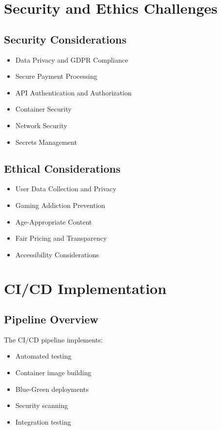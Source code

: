 \documentclass[12pt]{report}
\begin{document}
\chapter{Security and Ethics Challenges}
\section{Security Considerations}
\begin{itemize}
    \item Data Privacy and GDPR Compliance
    \item Secure Payment Processing
    \item API Authentication and Authorization
    \item Container Security
    \item Network Security
    \item Secrets Management
\end{itemize}

\section{Ethical Considerations}
\begin{itemize}
    \item User Data Collection and Privacy
    \item Gaming Addiction Prevention
    \item Age-Appropriate Content
    \item Fair Pricing and Transparency
    \item Accessibility Considerations
\end{itemize}

\chapter{CI/CD Implementation}
\section{Pipeline Overview}
The CI/CD pipeline implements:
\begin{itemize}
    \item Automated testing
    \item Container image building
    \item Blue-Green deployments
    \item Security scanning
    \item Integration testing
\end{itemize}
\end{document}

